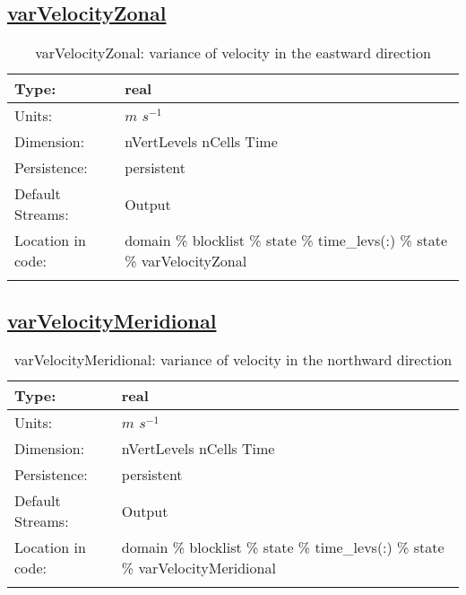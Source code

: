 \subsection[varVelocityZonal]{\hyperref[sec:var_tab_state]{varVelocityZonal}}
\label{subsec:var_sec_state_varVelocityZonal}
\begin{center}
\begin{longtable}{| p{2.0in} | p{4.0in} |}
        \hline 
        Type: & real \\
        \hline 
        Units: & $m$ $s^{-1}$ \\
        \hline 
        Dimension: & nVertLevels nCells Time \\
        \hline 
        Persistence: & persistent \\
        \hline 
		 Default Streams: & Output  \\
        \hline 
		 Location in code: & domain \% blocklist \% state \% time\_levs(:) \% state \% varVelocityZonal \\
		 \hline 
    \caption{varVelocityZonal: variance of velocity in the eastward direction}
\end{longtable}
\end{center}
\subsection[varVelocityMeridional]{\hyperref[sec:var_tab_state]{varVelocityMeridional}}
\label{subsec:var_sec_state_varVelocityMeridional}
\begin{center}
\begin{longtable}{| p{2.0in} | p{4.0in} |}
        \hline 
        Type: & real \\
        \hline 
        Units: & $m$ $s^{-1}$ \\
        \hline 
        Dimension: & nVertLevels nCells Time \\
        \hline 
        Persistence: & persistent \\
        \hline 
		 Default Streams: & Output  \\
        \hline 
		 Location in code: & domain \% blocklist \% state \% time\_levs(:) \% state \% varVelocityMeridional \\
		 \hline 
    \caption{varVelocityMeridional: variance of velocity in the northward direction}
\end{longtable}
\end{center}
